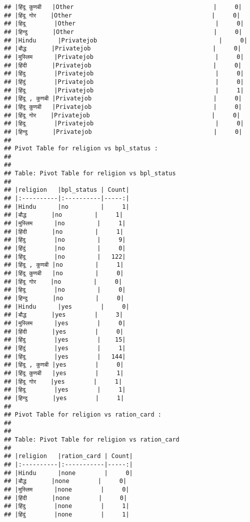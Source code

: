 \documentclass[
]{article}
\begin{document}
\begin{verbatim}
## |हिंदू कुणबी   |Other                                       |     0|
## |हिंदू गोर    |Other                                       |     0|
## |हिदू        |Other                                       |     0|
## |हिन्दु       |Other                                       |     0|
## |Hindu      |Privatejob                                  |     0|
## |बौद्ध       |Privatejob                                  |     0|
## |मुस्लिम      |Privatejob                                  |     0|
## |हिंदी       |Privatejob                                  |     0|
## |हिंदु        |Privatejob                                  |     0|
## |हिंदुं        |Privatejob                                  |     0|
## |हिंदू        |Privatejob                                  |     1|
## |हिंदू , कुणबी |Privatejob                                  |     0|
## |हिंदू कुणबी   |Privatejob                                  |     0|
## |हिंदू गोर    |Privatejob                                  |     0|
## |हिदू        |Privatejob                                  |     0|
## |हिन्दु       |Privatejob                                  |     0|
## 
## Pivot Table for religion vs bpl_status :
## 
## 
## Table: Pivot Table for religion vs bpl_status
## 
## |religion   |bpl_status | Count|
## |:----------|:----------|-----:|
## |Hindu      |no         |     1|
## |बौद्ध       |no         |     1|
## |मुस्लिम      |no         |     1|
## |हिंदी       |no         |     1|
## |हिंदु        |no         |     9|
## |हिंदुं        |no         |     0|
## |हिंदू        |no         |   122|
## |हिंदू , कुणबी |no         |     1|
## |हिंदू कुणबी   |no         |     0|
## |हिंदू गोर    |no         |     0|
## |हिदू        |no         |     0|
## |हिन्दु       |no         |     0|
## |Hindu      |yes        |     0|
## |बौद्ध       |yes        |     3|
## |मुस्लिम      |yes        |     0|
## |हिंदी       |yes        |     0|
## |हिंदु        |yes        |    15|
## |हिंदुं        |yes        |     1|
## |हिंदू        |yes        |   144|
## |हिंदू , कुणबी |yes        |     0|
## |हिंदू कुणबी   |yes        |     1|
## |हिंदू गोर    |yes        |     1|
## |हिदू        |yes        |     1|
## |हिन्दु       |yes        |     1|
## 
## Pivot Table for religion vs ration_card :
## 
## 
## Table: Pivot Table for religion vs ration_card
## 
## |religion   |ration_card | Count|
## |:----------|:-----------|-----:|
## |Hindu      |none        |     0|
## |बौद्ध       |none        |     0|
## |मुस्लिम      |none        |     0|
## |हिंदी       |none        |     0|
## |हिंदु        |none        |     1|
## |हिंदुं        |none        |     1|

\end{verbatim}
\end{document}
